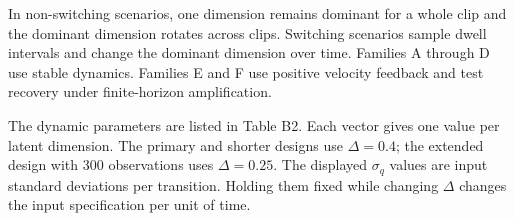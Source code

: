 \documentclass[
]{article}
\begin{document}
In non-switching scenarios, one dimension remains dominant for a whole
clip and the dominant dimension rotates across clips. Switching
scenarios sample dwell intervals and change the dominant dimension over
time. Families A through D use stable dynamics. Families E and F use
positive velocity feedback and test recovery under finite-horizon
amplification.

The dynamic parameters are listed in Table B2. Each vector gives one
value per latent dimension. The primary and shorter designs use
\(\Delta=0.4\); the extended design with 300 observations uses
\(\Delta=0.25\). The displayed \(\sigma_q\) values are input standard
deviations per transition. Holding them fixed while changing \(\Delta\)
changes the input specification per unit of time.

\begingroup\scriptsize\setlength{\tabcolsep}{4pt}
\end{document}
